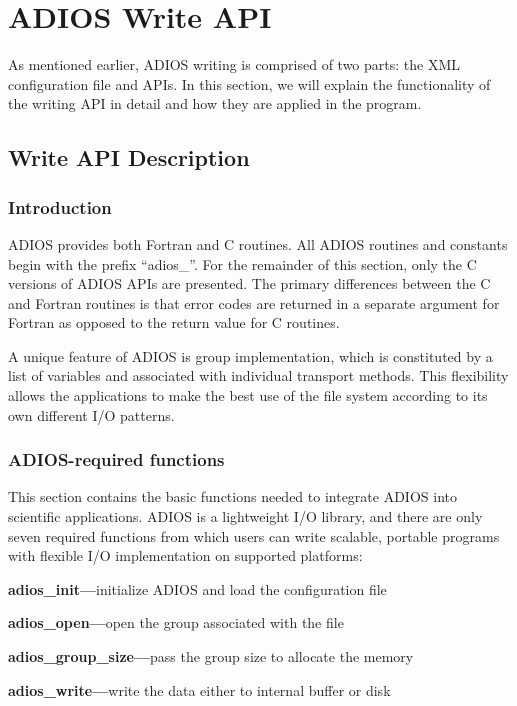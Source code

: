 \chapter{ADIOS Write API}

As mentioned earlier, ADIOS writing is comprised of two parts: the XML configuration 
file and APIs. In this section, we will explain the functionality of the writing 
API in detail and how they are applied in the program.  

\section{Write API Description}

\subsection{Introduction}

ADIOS provides both Fortran and C routines. All ADIOS routines and constants begin 
with the prefix ``adios\_''. For the remainder of this section, only the C versions 
of ADIOS APIs are presented. The primary differences between the C and Fortran 
routines is that error codes are returned in a separate argument for Fortran as 
opposed to the return value for C routines. 

A unique feature of ADIOS is group implementation, which is constituted by a list 
of variables and associated with individual transport methods. This flexibility 
allows the applications to make the best use of the file system according to its 
own different I/O patterns.

\subsection{ADIOS-required functions}

This section contains the basic functions needed to integrate ADIOS into scientific 
applications. ADIOS is a lightweight I/O library, and there are only seven required 
functions from which users can write scalable, portable programs with flexible 
I/O implementation on supported platforms:

\textbf{adios\_init---}initialize ADIOS and load the configuration file

\textbf{adios\_open---}open the group associated with the file

\textbf{adios\_group\_size---}pass the group size to allocate the memory

\textbf{adios\_write---}write the data either to internal buffer or disk

